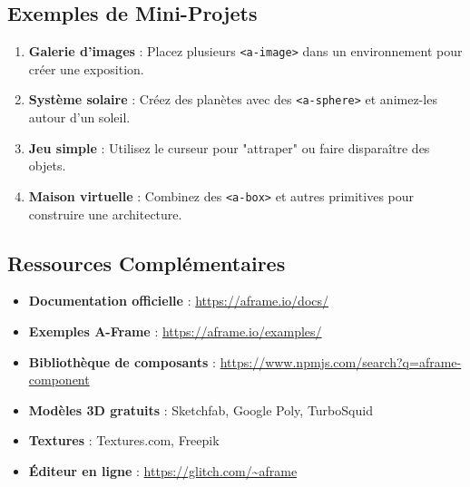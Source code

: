 \documentclass[12pt]{article}
\begin{document}
\subsection{Exemples de Mini-Projets}

\begin{enumerate}
    \item \textbf{Galerie d'images} : Placez plusieurs \texttt{<a-image>} dans un environnement pour créer une exposition.
    
    \item \textbf{Système solaire} : Créez des planètes avec des \texttt{<a-sphere>} et animez-les autour d'un soleil.
    
    \item \textbf{Jeu simple} : Utilisez le curseur pour "attraper" ou faire disparaître des objets.
    
    \item \textbf{Maison virtuelle} : Combinez des \texttt{<a-box>} et autres primitives pour construire une architecture.
\end{enumerate}

\subsection{Ressources Complémentaires}

\begin{itemize}
    \item \textbf{Documentation officielle} : \url{https://aframe.io/docs/}
    \item \textbf{Exemples A-Frame} : \url{https://aframe.io/examples/}
    \item \textbf{Bibliothèque de composants} : \url{https://www.npmjs.com/search?q=aframe-component}
    \item \textbf{Modèles 3D gratuits} : Sketchfab, Google Poly, TurboSquid
    \item \textbf{Textures} : Textures.com, Freepik
    \item \textbf{Éditeur en ligne} : \url{https://glitch.com/~aframe}
\end{itemize}
\end{document}
